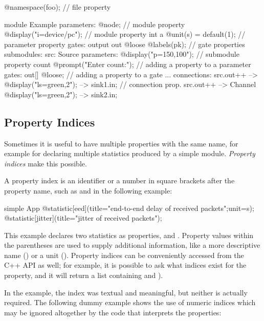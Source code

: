 \begin{ned}
@namespace(foo);  // file property

module Example
{
    parameters:
       @node;   // module property
       @display("i=device/pc");   // module property
       int a @unit(s) = default(1); // parameter property
    gates:
       output out @loose @labels(pk);  // gate properties
    submodules:
       src: Source {
           parameters:
              @display("p=150,100");  // submodule property
              count @prompt("Enter count:"); // adding a property to a parameter
           gates:
              out[] @loose;  // adding a property to a gate
       }
       ...
    connections:
       src.out++ --> { @display("ls=green,2"); } --> sink1.in; // connection prop.
       src.out++ --> Channel { @display("ls=green,2"); } --> sink2.in;
}
\end{ned}


\subsection{Property Indices}
\label{sec:ned-lang:property-indices}

Sometimes it is useful to have multiple properties with the same name, for
example for declaring multiple statistics produced by a simple module.
\textit{Property indices} make this possible.

A property index is an identifier or a number in square brackets after the
property name, such as  and  in the following example:

\begin{ned}
simple App {
    @statistic[eed](title="end-to-end delay of received packets";unit=s);
    @statistic[jitter](title="jitter of received packets");
}
\end{ned}

This example declares two statistics as  properties,
 and . Property values within the
parentheses are used to supply additional information, like a more descriptive
name () or a unit (). Property indices can be
conveniently accessed from the C++ API as well; for example, it is possible to
ask what indices exist for the  property, and it will return a
list containing  and ).

In the  example, the index was textual and meaningful, but
neither is actually required. The following dummy example shows the use of
numeric indices which may be ignored altogether by the code that interprets the
properties:

